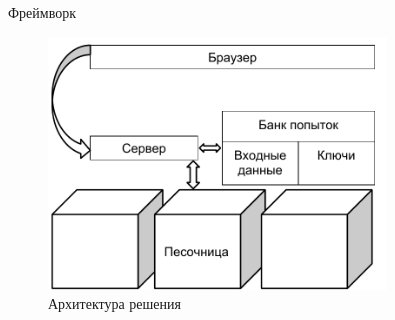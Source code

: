 \documentclass{beamer}
\begin{document}
\begin{frame}{Фреймворк}
  \begin{figure}
    \includegraphics[width=0.8\textwidth]{../res/arch.pdf}
    \caption{Архитектура решения}
  \end{figure}

\end{frame}
\end{document}
